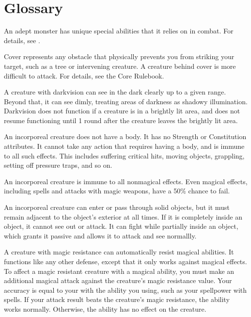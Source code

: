 \chapter{Glossary}\label{Glossary}

 An adept monster has unique special abilities that it relies on in combat.
For details, see .

 Cover represents any obstacle that physically prevents you from striking your target, such as a tree or intervening creature. A creature behind cover is more difficult to attack.
For details, see the Core Rulebook.

 A creature with darkvision can see in the dark clearly up to a given range.
Beyond that, it can see dimly, treating areas of darkness as shadowy illumination.
Darkvision does not function if a creature is in a brightly lit area, and does not resume functioning until 1 round after the creature leaves the brightly lit area.

 An incorporeal creature does not have a body.
It has no Strength or Constitution attributes.
It cannot take any action that requires having a body, and is immune to all such effects.
This includes suffering critical hits, moving objects, grappling, setting off pressure traps, and so on.

An incorporeal creature is immune to all nonmagical effects.
Even magical effects, including spells and attacks with magic weapons, have a 50\% chance to fail.

An incorporeal creature can enter or pass through solid objects, but it must remain adjacent to the object's exterior at all times.
If it is completely inside an object, it cannot see out or attack.
It can fight while partially inside an object, which grants it passive  and allows it to attack and see normallly.

 A creature with magic resistance can automatically resist magical abilities.
It functions like any other defense, except that it only works against magical effects.
To affect a magic resistant creature with a magical ability, you must make an additional magical attack against the creature's magic resistance value.
Your accuracy is equal to your  with the ability you using, such as your spellpower with spells.
If your attack result beats the creature's magic resistance, the ability works normally.
Otherwise, the ability has no effect on the creature.

